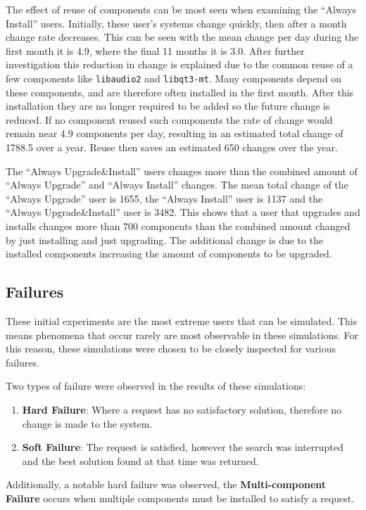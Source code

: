 The effect of reuse of components can be most seen when examining the ``Always Install'' users.
Initially, these user's systems change quickly, then after a month change rate decreases.
This can be seen with the mean change per day during the first month it is 4.9, where the final 11 months it is 3.0.
After further investigation this reduction in change is explained due to the common reuse of a few components like \texttt{libaudio2} and \texttt{libqt3-mt}.
Many components depend on these components, and are therefore often installed in the first month.
After this installation they are no longer required to be added so the future change is reduced.
If no component reused such components the rate of change would remain near 4.9 components per day, resulting in an estimated total change of 1788.5 over a year.
Reuse then saves an estimated 650 changes over the year.

The ``Always Upgrade\&Install'' users changes more than the combined amount of ``Always Upgrade'' and ``Always Install'' changes.
The mean total change of the ``Always Upgrade'' user is 1655, the ``Always Install'' user is 1137 and the ``Always Upgrade\&Install'' user is 3482.
This shows that a user that upgrades and installs changes more than 700 components than the combined amount changed by just installing and just upgrading.
The additional change is due to the installed components increasing the amount of components to be upgraded.


\subsection{Failures}
These initial experiments are the most extreme users that can be simulated.
This means phenomena that occur rarely are most observable in these simulations.
For this reason, these simulations were chosen to be closely inspected for various failures.

Two types of failure were observed in the results of these simulations:
\begin{enumerate}
  \item \textbf{Hard Failure}: Where a request has no satisfactory solution, therefore no change is made to the system.
  \item \textbf{Soft Failure}: The request is satisfied, however the search was interrupted and the best solution found at that time was returned.
\end{enumerate}
Additionally, a notable hard failure was observed, the \textbf{Multi-component Failure} occurs when multiple components must be installed to satisfy a request. 

